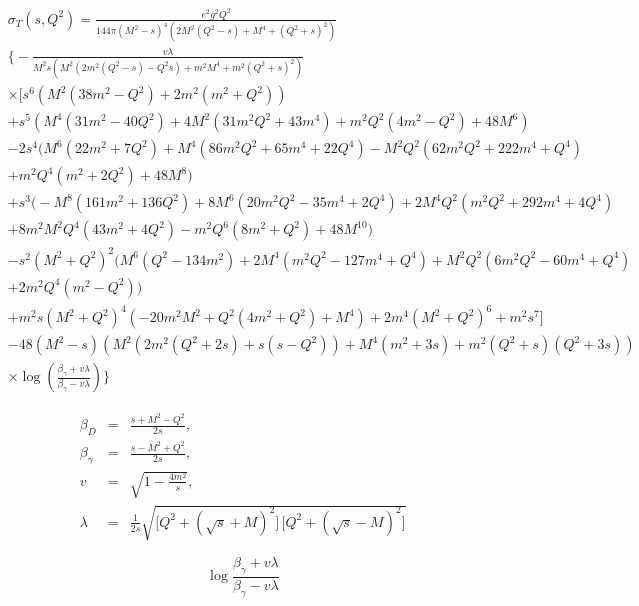 \documentclass[prl,
twocolumn,
showpacs,preprintnumbers,amsmath,amssymb,
superscriptaddress,
a4paper,nofootinbib,longbibliography]{revtex4-2}
\def\beq{\begin{equation}}
\def\eeq{\end{equation}}
\def\bea{\begin{eqnarray}}
\def\eea{\end{eqnarray}}
\def\be{\beta}
\def\ga{\gamma} \def\Ga{{\it\Gamma}}
\def\la{\lambda} \def\La{{\Lambda}}
\begin{document}
\begin{align}
   &\sigma_T(s,Q^2)=\frac{e^2 g^2 Q^2}{144 \pi  \left(M^2-s\right)^4 \left(2 M^2
   \left(Q^2-s\right)+M^4+\left(Q^2+s\right)^2\right)}\nonumber\\
   &\Bigg\{-\frac{v\lambda}{M^2 s \left(M^2 \left(2 m^2 \left(Q^2-s\right)-Q^2 s\right)+m^2 M^4+m^2
   \left(Q^2+s\right)^2\right)}\nonumber\\
   &\times\Bigg[s^6 \left(M^2 \left(38
   m^2-Q^2\right)+2 m^2 \left(m^2+Q^2\right)\right)\nonumber\\
   &+s^5 \left(M^4 \left(31 m^2-40 Q^2\right)+4 M^2 \left(31 m^2 Q^2+43 m^4\right)+m^2 Q^2 \left(4 m^2-Q^2\right)+48
   M^6\right)\nonumber\\
   &-2 s^4 \Big(M^6 \left(22 m^2+7 Q^2\right)+M^4 \left(86 m^2 Q^2+65 m^4+22 Q^4\right)-M^2 Q^2 \left(62 m^2 Q^2+222 m^4+Q^4\right)\nonumber\\
   &+m^2 Q^4 \left(m^2+2
   Q^2\right)+48 M^8\Big)\nonumber\\
   &+s^3 \Big(-M^8 \left(161 m^2+136 Q^2\right)+8 M^6 \left(20 m^2 Q^2-35 m^4+2 Q^4\right)+2 M^4 Q^2 \left(m^2 Q^2+292 m^4+4 Q^4\right)\nonumber\\
   &+8 m^2
   M^2 Q^4 \left(43 m^2+4 Q^2\right)-m^2 Q^6 \left(8 m^2+Q^2\right)+48 M^{10}\Big)\nonumber\\
   &-s^2 \left(M^2+Q^2\right)^2 \Big(M^6 \left(Q^2-134 m^2\right)+2 M^4 \left(m^2
   Q^2-127 m^4+Q^4\right)+M^2 Q^2 \left(6 m^2 Q^2-60 m^4+Q^4\right)\nonumber\\
   &+2 m^2 Q^4 \left(m^2-Q^2\right)\Big)\nonumber\\
   &+m^2 s \left(M^2+Q^2\right)^4 \left(-20 m^2 M^2+Q^2 \left(4
   m^2+Q^2\right)+M^4\right)+2 m^4 \left(M^2+Q^2\right)^6+m^2 s^7\Bigg]\nonumber\\
   &-48 \left(M^2-s\right) \left(M^2 \left(2 m^2 \left(Q^2+2 s\right)+s \left(s-Q^2\right)\right)+M^4 \left(m^2+3 s\right)+m^2
   \left(Q^2+s\right) \left(Q^2+3 s\right)\right)\nonumber\\
   &\times \log \left(\frac{\beta_\gamma+v\lambda}{\beta_\gamma-v\lambda}\right)\Bigg\}
\end{align}

\bea
\be_D &=& \frac{s+M^2-Q^2}{2s} ,\\
\be_\ga &=& \frac{s-M^2+Q^2}{2s}, \\
v &=& \sqrt{1- \frac{4m^2}{s}},\\
\la &=& \frac{1}{2s} \sqrt{\big[Q^2 +(\sqrt{s} +M) ^2 \big]
\, \big[Q^2 +(\sqrt{s} -M) ^2 \big]}
\eea

\beq 
\log \frac{ \beta_\ga + v\la }{\beta_\ga - v\la }
\eeq
\end{document}
